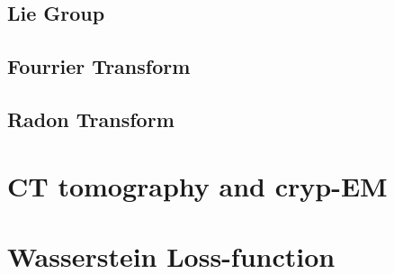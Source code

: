 \subsection{Lie Group}
\subsection{Fourrier Transform}
\subsection{Radon Transform}

\section{CT tomography and cryp-EM}

\section{Wasserstein Loss-function}

